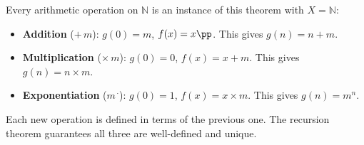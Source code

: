\begin{remark}
Every arithmetic operation on $\mathbb{N}$ is an instance of this
theorem with $X = \mathbb{N}$:
\begin{itemize}
  \item \textbf{Addition} ($+\, m$): $g(0) = m$, $f(x) = x\pp$.
    This gives $g(n) = n + m$.
  \item \textbf{Multiplication} ($\times\, m$): $g(0) = 0$,
    $f(x) = x + m$. This gives $g(n) = n \times m$.
  \item \textbf{Exponentiation} ($m^{\,\cdot}$): $g(0) = 1$,
    $f(x) = x \times m$. This gives $g(n) = m^n$.
\end{itemize}
Each new operation is defined in terms of the previous one.
The recursion theorem guarantees all three are well-defined and unique.
\end{remark}